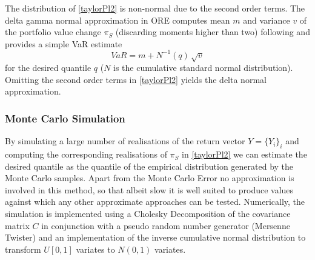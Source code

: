 \documentclass[12pt, a4paper]{article}
\begin{document}
\begin{appendix}
The distribution of \eqref{taylorPl2} is non-normal due to the second order terms. 
The delta gamma normal approximation in ORE computes mean $m$ and variance $v$ of the portfolio value change $\pi_S$ (discarding moments higher than two) following \cite{alexander} and provides a simple VaR estimate 
$$
VaR = m + N^{-1}(q)\,\sqrt{v}
$$
for the desired quantile $q$ ($N$ is the cumulative standard normal distribution). Omitting the second order terms in \eqref{taylorPl2} yields the delta normal approximation.
 
\subsubsection*{Monte Carlo Simulation}

By simulating a large number of realisations of the return vector $Y=\{ Y_i \}_i$ and computing the corresponding
realisations of $\pi_S$ in \eqref{taylorPl2} we can estimate the desired quantile as the quantile of the empirical
distribution generated by the Monte Carlo samples. Apart from the Monte Carlo Error no approximation is involved in this
method, so that albeit slow it is well suited to produce values against which any other approximate approaches can be tested. Numerically, the simulation is implemented using a Cholesky Decomposition
of the covariance matrix $C$ in conjunction with a pseudo random number generator (Mersenne Twister) and an
implementation of the inverse cumulative normal distribution to transform $U[0,1]$ variates to $N(0,1)$ variates.

\end{appendix}

\end{document}
